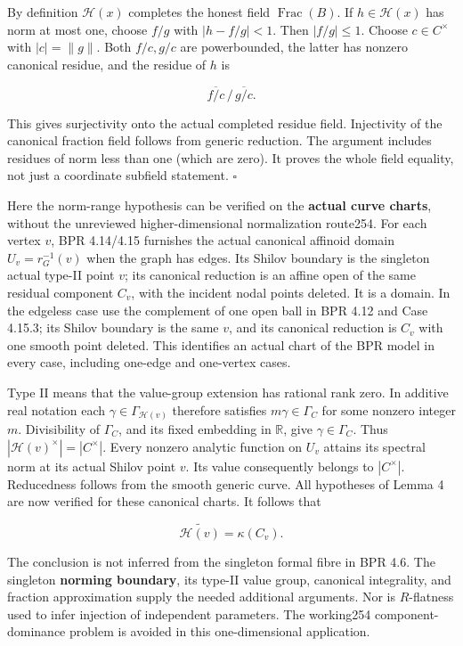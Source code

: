 \documentclass[
  11pt,
]{article}
\begin{document}
By definition \(\mathcal H(x)\) completes the honest field
\(\operatorname{Frac}(B)\). If \(h\in\mathcal H(x)\) has norm at most
one, choose \(f/g\) with \(|h-f/g|<1\). Then \(|f/g|\leq1\). Choose
\(c\in C^\times\) with \(|c|=\|g\|\). Both \(f/c,g/c\) are powerbounded,
the latter has nonzero canonical residue, and the residue of \(h\) is

\[
  \overline{f/c}\,/\,\overline{g/c}.
\]

This gives surjectivity onto the actual completed residue field.
Injectivity of the canonical fraction field follows from generic
reduction. The argument includes residues of norm less than one (which
are zero). It proves the whole field equality, not just a coordinate
subfield statement. \(\square\)

Here the norm-range hypothesis can be verified on the \textbf{actual
curve charts}, without the unreviewed higher-dimensional normalization
route254. For each vertex \(v\), BPR 4.14/4.15 furnishes the actual
canonical affinoid domain \(U_v=r_G^{-1}(v)\) when the graph has edges.
Its Shilov boundary is the singleton actual type-II point \(v\); its
canonical reduction is an affine open of the same residual component
\(C_v\), with the incident nodal points deleted. It is a domain. In the
edgeless case use the complement of one open ball in BPR 4.12 and Case
4.15.3; its Shilov boundary is the same \(v\), and its canonical
reduction is \(C_v\) with one smooth point deleted. This identifies an
actual chart of the BPR model in every case, including one-edge and
one-vertex cases.

Type II means that the value-group extension has rational rank zero. In
additive real notation each \(\gamma\in\Gamma_{\mathcal H(v)}\)
therefore satisfies \(m\gamma\in\Gamma_C\) for some nonzero integer
\(m\). Divisibility of \(\Gamma_C\), and its fixed embedding in
\(\mathbb R\), give \(\gamma\in\Gamma_C\). Thus
\(|\mathcal H(v)^\times|=|C^\times|\). Every nonzero analytic function
on \(U_v\) attains its spectral norm at its actual Shilov point \(v\).
Its value consequently belongs to \(|C^\times|\). Reducedness follows
from the smooth generic curve. All hypotheses of Lemma 4 are now
verified for these canonical charts. It follows that

\[
 \widetilde{\mathcal H(v)}=\kappa(C_v).
\]

The conclusion is not inferred from the singleton formal fibre in BPR
4.6. The singleton \textbf{norming boundary}, its type-II value group,
canonical integrality, and fraction approximation supply the needed
additional arguments. Nor is \(R\)-flatness used to infer injection of
independent parameters. The working254 component-dominance problem is
avoided in this one-dimensional application.
\end{document}
